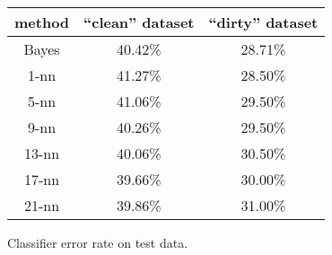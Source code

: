 \begin{figure}[!htbp]
\begin{center}
\begin{tabular}{ |c|c|c| } 
 \hline
 method & ``clean'' dataset & ``dirty'' dataset \\ 
 \hline
 Bayes & 40.42\% & 28.71\% \\ 
 1-nn & 41.27\% & 28.50\% \\
 5-nn & 41.06\% & 29.50\% \\ 
 9-nn & 40.26\% & 29.50\% \\ 
 13-nn & 40.06\% & 30.50\% \\ 
 17-nn & 39.66\% & 30.00\% \\ 
 21-nn & 39.86\% & 31.00\% \\
 \hline
\end{tabular}
\end{center}
\caption{
Classifier error rate on test data.
}
\label{fig:error_rates}
\end{figure}